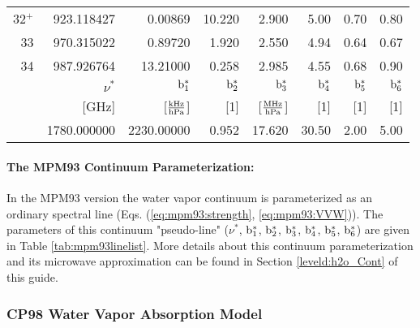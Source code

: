 \begin{longtable}{rrrrrrrr}
32$^+$ & 923.118427 & 0.00869 & 10.220& 2.900 & 5.00 & 0.70 & 0.80 \\
33     & 970.315022 & 0.89720 & 1.920 & 2.550 & 4.94 & 0.64 & 0.67 \\
34     & 987.926764 & 13.21000& 0.258 & 2.985 & 4.55 & 0.68 & 0.90 \\
\hline
 & $\nu^*$ & $\rm b^*_{\rm 1}$ & $\rm b^*_{\rm 2}$ & $\rm b^*_{\rm 3}$ & $\rm b^*_{\rm 4}$ & $\rm b^*_{\rm 5}$ & $\rm b^*_{\rm 6}$\\
 & {\rm [GHz]}  & {[$\frac{\rm kHz}{\rm hPa}$]} & {\rm [1]} & 
 {[$\frac{\rm MHz}{\rm hPa}$]} & {\rm [1]} & {\rm [1]} & {\rm [1]} \\
\hline
 & 1780.000000 & 2230.00000 & 0.952 & 17.620 & 30.50 & 2.00 & 5.00 \\
\end{longtable}



\paragraph{The MPM93 Continuum Parameterization:}
\label{levele:mpm93:h2ocont}
In the MPM93 version the water vapor continuum is parameterized as an
ordinary spectral line (Eqs. (\ref{eq:mpm93:strength}, 
\ref{eq:mpm93:VVW})). The parameters of this continuum "pseudo-line" 
($\nu^*$, $\rm b^*_{\rm 1}$, $\rm b^*_{\rm 2}$, $\rm b^*_{\rm 3}$, $\rm b^*_{\rm 4}$, $\rm b^*_{\rm 5}$, $\rm b^*_{\rm 6}$) 
are given in Table \ref{tab:mpm93linelist}. More details about 
this continuum parameterization and its microwave approximation can be 
found in Section \ref{leveld:h2o_Cont} of this guide.




\subsubsection{CP98 Water Vapor Absorption Model}
\label{leveld:cp98}

